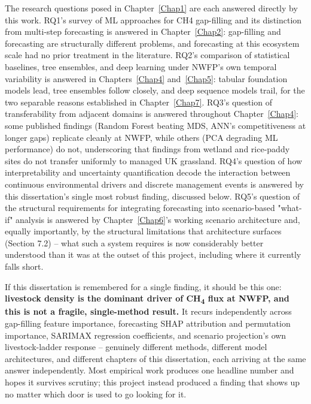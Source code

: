 The research questions posed in Chapter~\ref{Chap1} are each answered directly by this work. RQ1's
survey of ML approaches for CH4 gap-filling and its distinction from multi-step forecasting is
answered in Chapter~\ref{Chap2}: gap-filling and forecasting are structurally different problems,
and forecasting at this ecosystem scale had no prior treatment in the literature. RQ2's comparison
of statistical baselines, tree ensembles, and deep learning under NWFP's own temporal variability is
answered in Chapters~\ref{Chap4} and~\ref{Chap5}: tabular foundation models lead, tree ensembles
follow closely, and deep sequence models trail, for the two separable reasons established in
Chapter~\ref{Chap7}. RQ3's question of transferability from adjacent domains is answered throughout
Chapter~\ref{Chap4}: some published findings (Random Forest beating MDS, ANN's competitiveness at
longer gaps) replicate cleanly at NWFP, while others (PCA degrading ML performance) do not,
underscoring that findings from wetland and rice-paddy sites do not transfer uniformly to managed
UK grassland. RQ4's question of how interpretability and uncertainty quantification decode the
interaction between continuous environmental drivers and discrete management events is answered by
this dissertation's single most robust finding, discussed below. RQ5's question of the structural
requirements for integrating forecasting into scenario-based "what-if" analysis is answered by
Chapter~\ref{Chap6}'s working scenario architecture and, equally importantly, by the structural
limitations that architecture surfaces (Section 7.2) -- what such a system requires is now
considerably better understood than it was at the outset of this project, including where it
currently falls short.

If this dissertation is remembered for a single finding, it should be this one: \textbf{livestock
density is the dominant driver of CH\textsubscript{4} flux at NWFP, and this is not a fragile,
single-method result.} It recurs independently across gap-filling feature importance, forecasting
SHAP attribution and permutation importance, SARIMAX regression coefficients, and scenario
projection's own livestock-ladder response -- genuinely different methods, different model
architectures, and different chapters of this dissertation, each arriving at the same answer
independently. Most empirical work produces one headline number and hopes it survives scrutiny; this
project instead produced a finding that shows up no matter which door is used to go looking for it.

